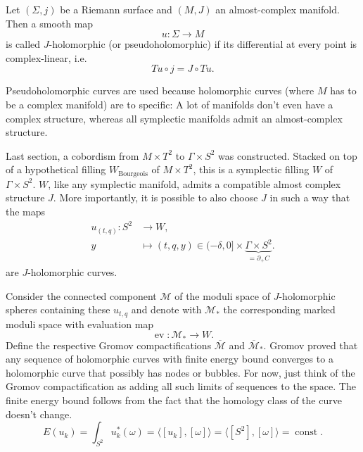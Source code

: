 \begin{definition}
    Let $(\Sigma, j)$ be a Riemann surface and $(M, J)$ an almost-complex manifold. Then a smooth map
    \[
        u \colon \Sigma \to M
    \]
    is called $J$-holomorphic (or pseudoholomorphic) if its differential at every point is complex-linear, i.e.
    \[
        Tu \circ j = J \circ Tu.
    \]
\end{definition}

Pseudoholomorphic curves are used because holomorphic curves (where $M$ has to be a complex manifold) are to specific: 
A lot of manifolds don't even have a complex structure, whereas all symplectic manifolds admit an almost-complex structure.

%

Last section, a cobordism from $M\times T^2$ to $\Gamma \times S^2$ was constructed.
Stacked on top of a hypothetical filling $W_\text{Bourgeois}$ of $M\times T^2$, this is a symplectic filling $W$ of $\Gamma \times S^2$.
$W$, like any symplectic manifold, admits a compatible almost complex structure $J$.
More importantly, it is possible to also choose $J$ in such a way that the maps
\begin{align*}
    u_{(t,q)} \colon S^2 &\to W,\\
    y &\mapsto (t, q, y) \in (-\delta, 0] \times \underbrace{\Gamma \times S^2}_{= \partial_+ C}.
\end{align*}
are $J$-holomorphic curves.

Consider the connected component $\mathcal{M}$ of the moduli space of $J$-holomorphic spheres containing these $u_{t,q}$
and denote with $\mathcal{M}_*$ the corresponding marked moduli space with evaluation map
\[
    \operatorname{ev}\colon \mathcal{M}_* \to W.
\]
Define the respective Gromov compactifications $\overline{\mathcal{M}}$ and $\overline{\mathcal{M}}_*$.
Gromov proved that any sequence of holomorphic curves with finite energy bound converges to a
holomorphic curve that possibly has nodes or bubbles.
For now, just think of the Gromov compactification as adding all such limits of sequences to the space.
The finite energy bound follows from the fact that the homology class of the curve doesn't change.
\[
    E(u_k) = \int_{S^2} u_k^*(\omega) = \langle [u_k], [\omega] \rangle = \langle [S^2], [\omega]\rangle = \operatorname{const}.
\]

